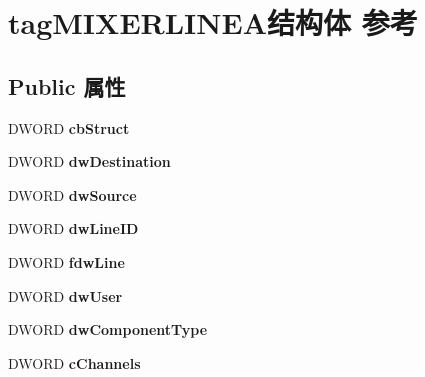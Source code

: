 \hypertarget{structtag_m_i_x_e_r_l_i_n_e_a}{}\section{tag\+M\+I\+X\+E\+R\+L\+I\+N\+E\+A结构体 参考}
\label{structtag_m_i_x_e_r_l_i_n_e_a}
\subsection*{Public 属性}
\begin{DoxyCompactItemize}
\item 
\mbox{\label{structtag_m_i_x_e_r_l_i_n_e_a_af4031e0dabfa201ac35dbbc63bb90df7}} 
D\+W\+O\+RD {\bfseries cb\+Struct}
\item 
\mbox{\label{structtag_m_i_x_e_r_l_i_n_e_a_a2b54cbe7b35f578361b59a0c5a17028e}} 
D\+W\+O\+RD {\bfseries dw\+Destination}
\item 
\mbox{\label{structtag_m_i_x_e_r_l_i_n_e_a_ab7423b2fa8a9d3bf9739cc013b0f8333}} 
D\+W\+O\+RD {\bfseries dw\+Source}
\item 
\mbox{\label{structtag_m_i_x_e_r_l_i_n_e_a_ab6460cb803476888f306e9485eedfdda}} 
D\+W\+O\+RD {\bfseries dw\+Line\+ID}
\item 
\mbox{\label{structtag_m_i_x_e_r_l_i_n_e_a_a9d2fc79102d161b2bfef447b9786e08d}} 
D\+W\+O\+RD {\bfseries fdw\+Line}
\item 
\mbox{\label{structtag_m_i_x_e_r_l_i_n_e_a_a2e753271bbd30cdaee4b746b5526fded}} 
D\+W\+O\+RD {\bfseries dw\+User}
\item 
\mbox{\label{structtag_m_i_x_e_r_l_i_n_e_a_a55f0c452ece0fe0122735c02fb33882b}} 
D\+W\+O\+RD {\bfseries dw\+Component\+Type}
\item 
\mbox{\label{structtag_m_i_x_e_r_l_i_n_e_a_afeca53b367b5db55bfbd2df5917116a5}} 
D\+W\+O\+RD {\bfseries c\+Channels}
\item 
\mbox{\label{structtag_m_i_x_e_r_l_i_n_e_a_adc96c58d2df5cc1116ff0710eb37edc7}} 

\end{DoxyCompactItemize}
